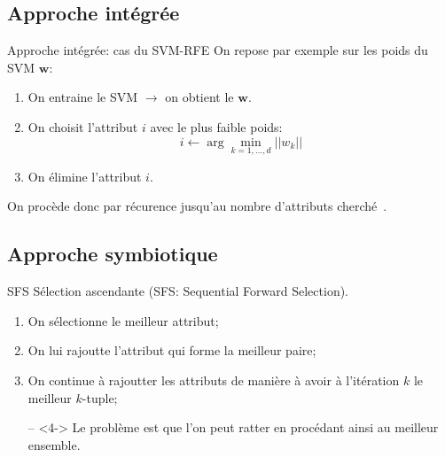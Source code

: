 \documentclass[9pt]{beamer}
\begin{document}
	\subsection[integrated approach]{Approche intégrée}
	\begin{frame}{Approche intégrée: cas du SVM-RFE}
		On repose par exemple sur les poids du SVM $\textbf{w}$:
		\begin{enumerate}
			\item<1-> On entraine le SVM $\longrightarrow$ on obtient le $\textbf{w}$.
			\item<2-> On choisit l'attribut $i$ avec le plus faible poids:
			$$ i \leftarrow \arg \min_{k=1,\dots,d}{\vert\vert w_k\vert\vert}$$
			\item<3-> On élimine l'attribut $i$.
		\end{enumerate}
		On procède donc par récurence jusqu'au nombre d'attributs cherché~\cite{Guyon2002}.
	\end{frame}

	\subsection[symbiotic approach]{Approche symbiotique}
	\begin{frame}{SFS}
		Sélection ascendante (SFS\@: Sequential Forward Selection).
		\begin{enumerate}
		\item<1-> On sélectionne le meilleur attribut;
		\item<2-> On lui rajoutte l'attribut qui forme la meilleur paire;
		\item<3-> On continue à rajoutter les attributs de manière à avoir à l'itération $k$ le meilleur $k$-tuple;
		\item[--]<4-> Le problème est que l'on peut ratter en procédant ainsi au meilleur ensemble.
		\end{enumerate}
	\end{frame}
\end{document}
